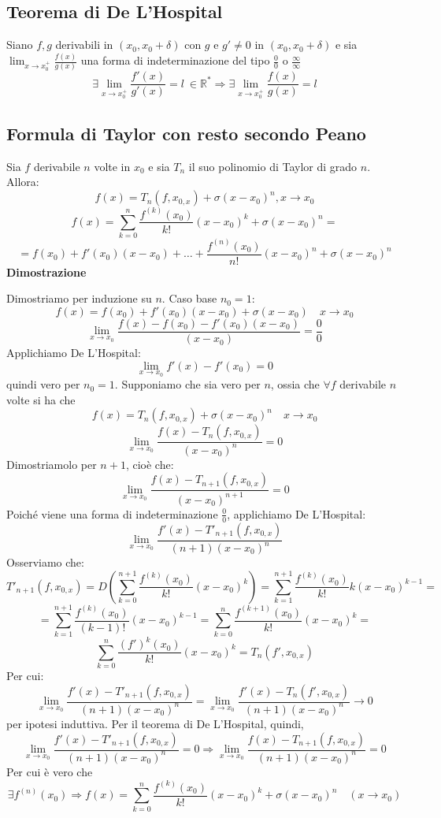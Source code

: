 \documentclass[12pt]{article}
\begin{document}
\subsection{Teorema di De L'Hospital}
Siano $f,g$ derivabili in $(x_0, x_0 + \delta)$
con $g$ e $g' \neq 0$ in $(x_0, x_0 + \delta)$
e sia $\displaystyle \lim_{x \to x^{+}_0} \frac{f(x)}{g(x)}$ una forma
di indeterminazione del tipo $\frac{0}{0}$ o $\frac{\infty}{\infty}$
\[
\exists \lim_{x \to x^{+}_0} \frac{f'(x)}{g'(x)} = l\ \in \mathbb{R}^{*} \Rightarrow \exists \lim_{x \to x^{+}_0} \frac{f(x)}{g(x)} = l
\]

\subsection{Formula di Taylor con resto secondo Peano}
Sia $f$ derivabile $n$ volte in $x_0$ e sia
$T_n$ il suo polinomio di Taylor di grado $n$.
Allora:
\[f(x) = T_n(f,x_{0,x}) + \sigma(x-x_0)^n, x \to x_0\]
\[f(x) = \sum_{k=0}^{n}\frac{f^{(k)}(x_0)}{k!}(x-x_0)^k + \sigma(x-x_0)^n =\]
\[ = f(x_0) + f'(x_0)(x-x_0)+\dots+\frac{f^{(n)}(x_0)}{n!}(x-x_0)^n + \sigma(x-x_0)^n \] \newline
\textbf{Dimostrazione}

Dimostriamo per induzione su $n$. Caso base $n_0 = 1$: 
\[ f(x) = f(x_0) + f'(x_0)(x-x_0)+\sigma(x-x_0) \quad x\to x_0\]
\[ \lim_{x \to x_0} \frac{f(x)-f(x_0) -f'(x_0)(x-x_0)}{(x-x_0)} = \frac{0}{0}\]
Applichiamo De L'Hospital: 
\[ \lim_{x \to x_0} f'(x) - f'(x_0) = 0\] 
quindi vero per $n_0 = 1$. Supponiamo che sia vero per $n$, ossia che 
$\forall f$ derivabile $n$ volte si ha che 
\[f(x) = T_n(f, x_{0,x}) + \sigma(x-x_0)^n \quad x \to x_0 \]
\[ \lim_{x \to x_0} \frac{f(x) - T_{n}(f, x_{0,x})}{(x-x_0)^{n}} = 0\]
Dimostriamolo per $n+1$, cioè che:
\[ \lim_{x \to x_0} \frac{f(x) - T_{n+1}(f, x_{0,x})}{(x-x_0)^{n+1}} = 0 \]
Poiché viene una forma di indeterminazione $\frac{0}{0}$,
applichiamo De L'Hospital:
\[ \lim_{x \to x_0} \frac{f'(x) - T'_{n+1}(f,x_{0,x})}{(n+1)(x-x_0)^n} \]
Osserviamo che:
\[ T'_{n+1}(f,x_{0,x}) = D(\sum_{k=0}^{n+1}\frac{f^{(k)}(x_0)}{k!}(x-x_0)^k) = \sum_{k=1}^{n+1}\frac{f^{(k)}(x_0)}{k!}k(x-x_0)^{k-1} = \]
\[ = \sum_{k=1}^{n+1}\frac{f^{(k)}(x_0)}{(k-1)!}(x-x_0)^{k-1} = \sum_{k=0}^{n}\frac{f^{(k+1)}(x_0)}{k!}(x-x_0)^{k} = \]
\[ \sum_{k=0}^{n}\frac{(f')^k(x_0)}{k!}(x-x_0)^{k} = T_n(f',x_{0,x})\]
Per cui:
\[ \lim_{x \to x_0} \frac{f'(x) - T'_{n+1}(f,x_{0,x})}{(n+1)(x-x_0)^n} = \lim_{x \to x_0} \frac{f'(x) - T_n(f',x_{0,x})}{(n+1)(x-x_0)^n} \to 0\] per ipotesi induttiva. Per il teorema di De L'Hospital, quindi,
\[ \lim_{x \to x_0} \frac{f'(x) - T'_{n+1}(f,x_{0,x})}{(n+1)(x-x_0)^n} = 0 \Rightarrow \lim_{x \to x_0} \frac{f(x) - T_{n+1}(f,x_{0,x})}{(n+1)(x-x_0)^n} = 0\]
Per cui è vero che
\[ \exists f^{(n)}(x_0) \Rightarrow f(x) = \sum_{k=0}^{n}\frac{f^{(k)}(x_0)}{k!}(x-x_0)^k + \sigma (x-x_0)^n \quad (x\to x_0)\]
\end{document}
